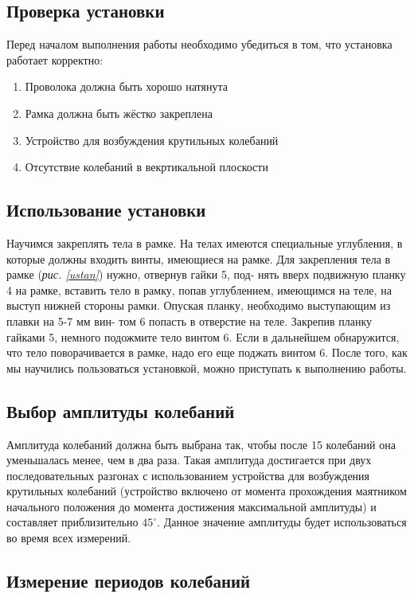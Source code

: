 \documentclass[a4paper,12pt]{article}
\begin{document}
\subsection{Проверка установки}

Перед началом выполнения работы необходимо убедиться в том, что установка работает корректно:
\begin{enumerate}
    \item Проволока должна быть хорошо натянута
    \item Рамка должна быть жёстко закреплена
    \item Устройство для возбуждения крутильных колебаний
    \item Отсутствие колебаний в векртикальной плоскости
\end{enumerate}

\subsection{Использование установки}

Научимся закреплять тела в рамке. На телах имеются специальные углубления, в которые должны входить винты, имеющиеся на рамке. Для закрепления тела в рамке (\textit{рис. \ref{ustan}}) нужно, отвернув гайки 5, под- нять вверх подвижную планку 4 на рамке, вставить тело в рамку, попав углублением, имеющимся на теле, на выступ нижней стороны рамки. Опуская планку, необходимо выступающим из плавки на 5-7 мм вин- том 6 попасть в отверстие на теле. Закрепив планку гайками 5, немного подожмите тело винтом 6. Если в дальнейшем обнаружится, что тело поворачивается в рамке, надо его еще поджать винтом 6. После того, как мы научились пользоваться установкой, можно приступать к выполнению работы.

\subsection{Выбор амплитуды колебаний}

Амплитуда колебаний должна быть выбрана так, чтобы после 15 колебаний она уменьшалась менее, чем в два раза. Такая амплитуда достигается при двух последовательных разгонах с использованием устройства для возбуждения крутильных колебаний (устройство включено от момента прохождения маятником начального положения до момента достижения максимальной амплитуды) и составляет приблизительно $45^\circ$. Данное значение амплитуды будет использоваться во время всех измерений.

\subsection{Измерение периодов колебаний}
\end{document}
